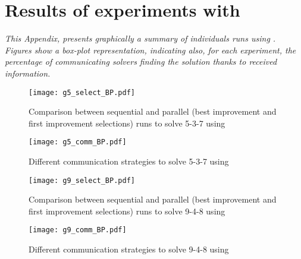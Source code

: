 \chapter{Results of experiments with \sgp}
\label{app:sgp}
\textit{This Appendix, presents graphically a summary of individuals runs using \sgp. Figures show a \textit{box-plot} representation, indicating also, for each experiment, the percentage of communicating solvers finding the solution thanks to received information.}
\vfill
\newpage


\begin{figure}[h]
\centering
\texttt{[image: g5\_select\_BP.pdf]}
\caption{Comparison between sequential and parallel (best improvement and first improvement selections) runs to solve \SGP{} 5-3-7 using \posl}
\end{figure}

\begin{figure}[h]
\centering
\texttt{[image: g5\_comm\_BP.pdf]}
\caption{Different communication strategies to solve \SGP{} 5-3-7 using \posl}
\end{figure}

\begin{figure}[h]
\centering
\texttt{[image: g9\_select\_BP.pdf]}
\caption{Comparison between sequential and parallel (best improvement and first improvement selections) runs to solve \SGP{} 9-4-8 using \posl}
\end{figure}

\begin{figure}[h]
\centering
\texttt{[image: g9\_comm\_BP.pdf]}
\caption{Different communication strategies to solve \SGP{} 9-4-8 using \posl}
\end{figure}